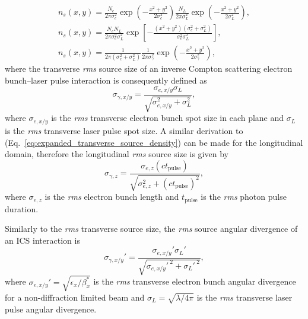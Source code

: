 \documentclass[../main.tex]{subfiles}
\begin{document}
\begin{align}
n_{s}\left(x,y\right) = \frac{N_{e}}{2\pi\sigma_{e}^{2}}\exp\left(-\frac{x^{2}+y^{2}}{2\sigma_{e}^{2}}\right)\frac{N_{L}}{2\pi\sigma_{L}^{2}}\exp\left(-\frac{x^{2}+y^{2}}{2\sigma_{L}^{2}}\right), \nonumber \\
n_{s}\left(x,y\right) = \frac{N_{e}N_{L}}{2\pi\sigma_{e}^{2}\sigma_{L}^{2}}\exp\left[-\frac{\left(x^{2}+y^{2}\right)\left(\sigma_{e}^{2}+\sigma_{L}^{2}\right)}{\sigma_{e}^{2}\sigma_{L}^{2}}\right], \nonumber \\
n_{s}\left(x,y\right) = \frac{1}{2\pi\left(\sigma_{e}^{2}+\sigma_{L}^{2}\right)}\frac{1}{2\pi\sigma_{\gamma}^{2}}\exp\left(-\frac{x^{2}+y^{2}}{2\sigma_{\gamma}^{2}}\right),
\label{eq:expanded_transverse_source_density}    
\end{align}
where the transverse \textit{rms} source size of an inverse Compton scattering electron bunch--laser pulse interaction is consequently defined as
\begin{equation}
\sigma_{\gamma,x/y} = \frac{\sigma_{e,x/y}\sigma_{L}}{\sqrt{\sigma_{e,x/y}^{2}+\sigma_{L}^{2}}},
\label{eq:source_size}
\end{equation}
where $\sigma_{e,x/y}$ is the \textit{rms} transverse electron bunch spot size in each plane and $\sigma_{L}$ is the \textit{rms} transverse laser pulse spot size. A similar derivation to (Eq.~\ref{eq:expanded_transverse_source_density}) can be made for the longitudinal domain, therefore the longitudinal \textit{rms} source size is given by
\begin{equation}
\sigma_{\gamma,z} = \frac{\sigma_{e,z}\left(ct_{\mathrm{pulse}}\right)}{\sqrt{\sigma_{e,z}^{2}+\left(ct_{\mathrm{pulse}}\right)^{2}}},
\label{eq:longitudinal_source_size}
\end{equation}
where $\sigma_{e,z}$ is the \textit{rms} electron bunch length and $t_{\mathrm{pulse}}$ is the \textit{rms} photon pulse duration. 

Similarly to the \textit{rms} transverse source size, the \textit{rms} source angular divergence of an ICS interaction is
\begin{equation}
\sigma_{\gamma,x/y}' = \frac{\sigma_{e,x/y}'\sigma_{L}'}{\sqrt{\sigma_{e,x/y}'^{~2}+\sigma_{L}'^{~2}}},
\label{eq:source_divergence}
\end{equation}
where $\sigma_{e,x/y}' = \sqrt{\epsilon_{x}/\beta_{x}^{*}}$ is the \textit{rms} transverse electron bunch angular divergence for a non-diffraction limited beam and $\sigma_{L} = \sqrt{\lambda/4\pi}$ is the \textit{rms} transverse laser pulse angular divergence.
\end{document}
